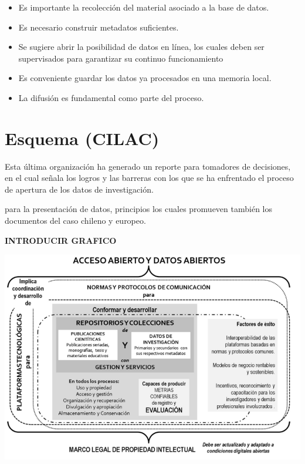 \documentclass[
  14pt,
]{book}
\let\origfigure\figure
\let\endorigfigure\endfigure
\renewenvironment{figure}[1][2] {
  \expandafter\origfigure\expandafter[H]
} {
  \endorigfigure
}
\begin{document}
\begin{itemize}
\item
  Es importante la recolección del material asociado a la base de datos.
\item
  Es necesario construir metadatos suficientes.
\item
  Se sugiere abrir la posibilidad de datos en línea, los cuales deben ser supervisados para garantizar su continuo funcionamiento
\item
  Es conveniente guardar los datos ya procesados en una memoria local.
\item
  La difusión es fundamental como parte del proceso.
\end{itemize}

\hypertarget{esquema-cilac}{%
\section{Esquema (CILAC)}\label{esquema-cilac}}

Esta última organización ha generado un reporte para tomadores de decisiones, en el cual señala los logros y las barreras con los que se ha enfrentado el proceso de apertura de los datos de investigación.

para la presentación de datos, principios los cuales promueven también los documentos del caso chileno y europeo.

\textbf{INTRODUCIR GRAFICO}

\begin{figure}[!ht]

{\centering \includegraphics[width=0.8\linewidth,]{esquemacilac} 

}

\caption{Propuesta CILAC}\label{fig:unnamed-chunk-24}
\end{figure}
\end{document}
